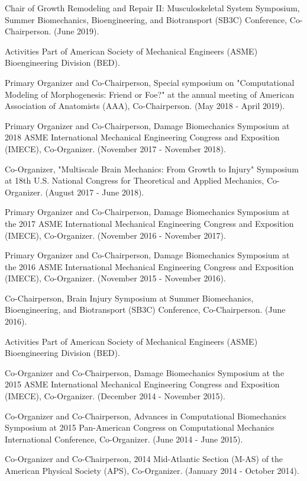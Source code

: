\documentclass[a4paper,10pt]{article}
\begin{document}
\hspace{1cm}Chair of Growth Remodeling and Repair II: Musculoskeletal System Symposium, Summer Biomechanics, Bioengineering, and Biotransport (SB3C) Conference, Co-Chairperson. (June 2019).

\hspace{1cm}Activities Part of American Society of Mechanical Engineers (ASME) Bioengineering Division (BED).

\hspace{1cm}Primary Organizer and Co-Chairperson, Special symposium on "Computational Modeling of Morphogenesis: Friend or Foe?" at the annual meeting of American Association of Anatomists (AAA), Co-Chairperson. (May 2018 - April 2019).

\hspace{1cm}Primary Organizer and Co-Chairperson, Damage Biomechanics Symposium at 2018 ASME International Mechanical Engineering Congress and Exposition (IMECE), Co-Organizer. (November 2017 - November 2018).

\hspace{1cm}Co-Organizer, "Multiscale Brain Mechanics: From Growth to Injury" Symposium at 18th U.S. National Congress for Theoretical and Applied Mechanics, Co-Organizer. (August 2017 - June 2018).

\hspace{1cm}Primary Organizer and Co-Chairperson, Damage Biomechanics Symposium at the 2017 ASME International Mechanical Engineering Congress and Exposition (IMECE), Co-Organizer. (November 2016 - November 2017).

\hspace{1cm}Primary Organizer and Co-Chairperson, Damage Biomechanics Symposium at the 2016 ASME International Mechanical Engineering Congress and Exposition (IMECE), Co-Organizer. (November 2015 - November 2016).

\hspace{1cm}Co-Chairperson, Brain Injury Symposium at Summer Biomechanics, Bioengineering, and Biotransport (SB3C) Conference, Co-Chairperson. (June 2016).

\hspace{1cm}Activities Part of American Society of Mechanical Engineers (ASME) Bioengineering Division (BED).

\hspace{1cm}Co-Organizer and Co-Chairperson, Damage Biomechanics Symposium at the 2015 ASME International Mechanical Engineering Congress and Exposition (IMECE), Co-Organizer. (December 2014 - November 2015).

\hspace{1cm}Co-Organizer and Co-Chairperson, Advances in Computational Biomechanics Symposium at 2015 Pan-American Congress on Computational Mechanics International Conference, Co-Organizer. (June 2014 - June 2015).

\hspace{1cm}Co-Organizer and Co-Chairperson, 2014 Mid-Atlantic Section (M-AS) of the American Physical Society (APS), Co-Organizer. (January 2014 - October 2014).
\end{document}
